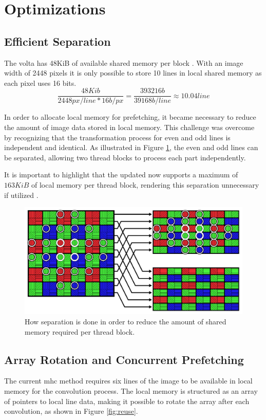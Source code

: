 \section{Optimizations}
\subsection{Efficient Separation}
The \gls{volta} has 48KiB of available shared memory per block \cite{rigerunNVIDIAJetsonXavier2023}.
With an image width of 2448 pixels \cite{lucidvisionlabsTriton0MPPolarization} it is only possible to store 10 lines in local shared memory as each pixel uses 16 bits.
\begin{equation*}
    \frac{48Kib}{2448px/line * 16b/px} = \frac{393216b}{39168b/line} \approx 10.04line
\end{equation*}

In order to allocate local memory for prefetching, it became necessary to reduce the amount of image data stored in local memory.
This challenge was overcome by recognizing that the transformation process for even and odd lines is independent and identical.
As illustrated in Figure \ref{fig:saperation}, the even and odd lines can be separated, allowing two thread blocks to process each part independently.

It is important to highlight that the updated \jo now supports a maximum of $163KiB$ of local memory per thread block, rendering this separation unnecessary if utilized \cite{CUDA2023}.
\begin{figure}[H]
    \centering
    \includegraphics[width=.8\textwidth]{figures/polarized_image/separation.pdf}
    \caption{How separation is done in order to reduce the amount of shared memory required per thread block.}
    \label{fig:saperation}
\end{figure}

\subsection{Array Rotation and Concurrent Prefetching}
The current \gls{mhc} method requires six lines of the image to be available in local memory for the convolution process.
The local memory is structured as an array of pointers to local line data, making it possible to rotate the array after each convolution, as shown in Figure \ref{fig:reuse}.

